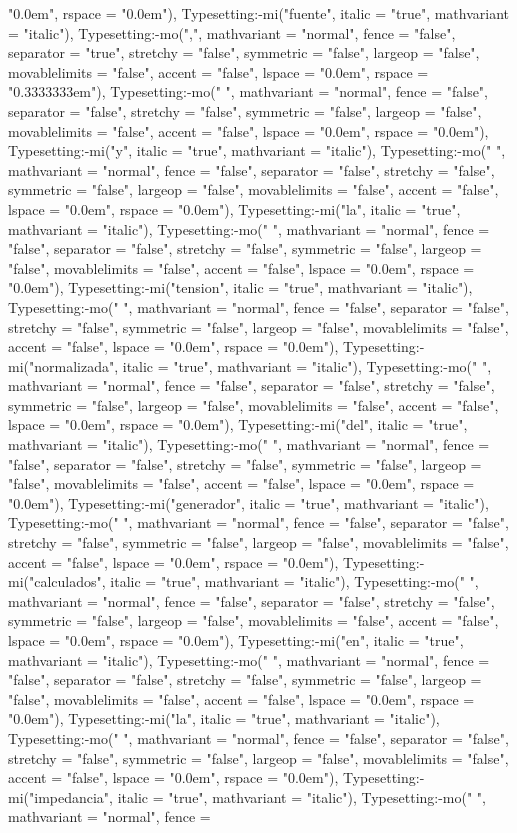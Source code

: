 \documentclass{article}
\begin{document}
\begin{Maple Normal}
{\begin{Maple Normal}
{"0.0em", rspace = "0.0em"), Typesetting:-mi("fuente", italic = "true", mathvariant = "italic"), Typesetting:-mo(",", mathvariant = "normal", fence = "false", separator = "true", stretchy = "false", symmetric = "false", largeop = "false", movablelimits = "false", accent = "false", lspace = "0.0em", rspace = "0.3333333em"), Typesetting:-mo(" ", mathvariant = "normal", fence = "false", separator = "false", stretchy = "false", symmetric = "false", largeop = "false", movablelimits = "false", accent = "false", lspace = "0.0em", rspace = "0.0em"), Typesetting:-mi("y", italic = "true", mathvariant = "italic"), Typesetting:-mo(" ", mathvariant = "normal", fence = "false", separator = "false", stretchy = "false", symmetric = "false", largeop = "false", movablelimits = "false", accent = "false", lspace = "0.0em", rspace = "0.0em"), Typesetting:-mi("la", italic = "true", mathvariant = "italic"), Typesetting:-mo(" ", mathvariant = "normal", fence = "false", separator = "false", stretchy = "false", symmetric = "false", largeop = "false", movablelimits = "false", accent = "false", lspace = "0.0em", rspace = "0.0em"), Typesetting:-mi("tension", italic = "true", mathvariant = "italic"), Typesetting:-mo(" ", mathvariant = "normal", fence = "false", separator = "false", stretchy = "false", symmetric = "false", largeop = "false", movablelimits = "false", accent = "false", lspace = "0.0em", rspace = "0.0em"), Typesetting:-mi("normalizada", italic = "true", mathvariant = "italic"), Typesetting:-mo(" ", mathvariant = "normal", fence = "false", separator = "false", stretchy = "false", symmetric = "false", largeop = "false", movablelimits = "false", accent = "false", lspace = "0.0em", rspace = "0.0em"), Typesetting:-mi("del", italic = "true", mathvariant = "italic"), Typesetting:-mo(" ", mathvariant = "normal", fence = "false", separator = "false", stretchy = "false", symmetric = "false", largeop = "false", movablelimits = "false", accent = "false", lspace = "0.0em", rspace = "0.0em"), Typesetting:-mi("generador", italic = "true", mathvariant = "italic"), Typesetting:-mo(" ", mathvariant = "normal", fence = "false", separator = "false", stretchy = "false", symmetric = "false", largeop = "false", movablelimits = "false", accent = "false", lspace = "0.0em", rspace = "0.0em"), Typesetting:-mi("calculados", italic = "true", mathvariant = "italic"), Typesetting:-mo(" ", mathvariant = "normal", fence = "false", separator = "false", stretchy = "false", symmetric = "false", largeop = "false", movablelimits = "false", accent = "false", lspace = "0.0em", rspace = "0.0em"), Typesetting:-mi("en", italic = "true", mathvariant = "italic"), Typesetting:-mo(" ", mathvariant = "normal", fence = "false", separator = "false", stretchy = "false", symmetric = "false", largeop = "false", movablelimits = "false", accent = "false", lspace = "0.0em", rspace = "0.0em"), Typesetting:-mi("la", italic = "true", mathvariant = "italic"), Typesetting:-mo(" ", mathvariant = "normal", fence = "false", separator = "false", stretchy = "false", symmetric = "false", largeop = "false", movablelimits = "false", accent = "false", lspace = "0.0em", rspace = "0.0em"), Typesetting:-mi("impedancia", italic = "true", mathvariant = "italic"), Typesetting:-mo(" ", mathvariant = "normal", fence = }
\end{Maple Normal}}
\end{Maple Normal}
\end{document}
